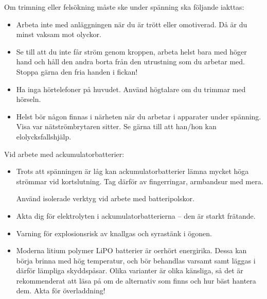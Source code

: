 Om trimning eller felsökning måste ske under spänning ska följande iakttas:
\begin{itemize}
\item Arbeta inte med anläggningen när du är trött eller omotiverad.
  Då är du minst vaksam mot olyckor.
\item Se till att du inte får ström genom kroppen, arbeta helst bara med höger
  hand och håll den andra borta från den utrustning som du arbetar med.
  Stoppa gärna den fria handen i fickan!
\item Ha inga hörtelefoner på huvudet.
  Använd högtalare om du trimmar med hörseln.
\item Helst bör någon finnas i närheten när du arbetar i apparater under
  spänning.
  Visa var nätströmbrytaren sitter.
  Se gärna till att han/hon kan elolycksfallshjälp.
\end{itemize}

Vid arbete med ackumulatorbatterier:
\begin{itemize}
\item Trots att spänningen är låg kan ackumulatorbatterier lämna
  mycket höga strömmar vid kortslutning.
  Tag därför av fingerringar, armbandsur med mera.

Använd isolerade verktyg vid arbete med batteripolskor.
\item Akta dig för elektrolyten i ackumulatorbatterierna -- den är
  starkt frätande.
\item Varning för explosionsrisk av knallgas och syrastänk i ögonen.
\item Moderna litium polymer LiPO batterier är oerhört energirika.
  Dessa kan börja brinna med hög temperatur, och bör behandlas varsamt samt
  läggas i därför lämpliga skyddspåsar.
  Olika varianter är olika känsliga, så det är rekommenderat att läsa på om
  de alternativ som finns och hur bäst hantera dem.
  Akta för överladdning!
\end{itemize}
